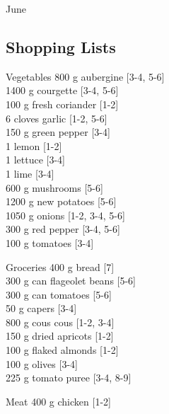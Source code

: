 \begin{menu}{June}
    \subsection*{Shopping Lists}
      \begin{shoppinglist}{Vegetables}
      800 g aubergine {\scriptsize[3-4, 5-6]}\\
      1400 g courgette {\scriptsize[3-4, 5-6]}\\
      100 g fresh coriander {\scriptsize[1-2]}\\
      6 cloves garlic {\scriptsize[1-2, 5-6]}\\
      150 g green pepper {\scriptsize[3-4]}\\
      1  lemon {\scriptsize[1-2]}\\
      1  lettuce {\scriptsize[3-4]}\\
      1  lime {\scriptsize[3-4]}\\
      600 g mushrooms {\scriptsize[5-6]}\\
      1200 g new potatoes {\scriptsize[5-6]}\\
      1050 g onions {\scriptsize[1-2, 3-4, 5-6]}\\
      300 g red pepper {\scriptsize[3-4, 5-6]}\\
      100 g tomatoes {\scriptsize[3-4]}\\
      \end{shoppinglist}%
      \begin{shoppinglist}{Groceries}
      400 g bread {\scriptsize[7]}\\
      300 g can flageolet beans {\scriptsize[5-6]}\\
      300 g can tomatoes {\scriptsize[5-6]}\\
      50 g capers {\scriptsize[3-4]}\\
      800 g cous cous {\scriptsize[1-2, 3-4]}\\
      150 g dried apricots {\scriptsize[1-2]}\\
      100 g flaked almonds {\scriptsize[1-2]}\\
      100 g olives {\scriptsize[3-4]}\\
      225 g tomato puree {\scriptsize[3-4, 8-9]}\\
      \end{shoppinglist}%
      \par\vfil %
      \begin{shoppinglist}{Meat}
      400 g chicken {\scriptsize[1-2]}\\

\end{shoppinglist}
\end{menu}
